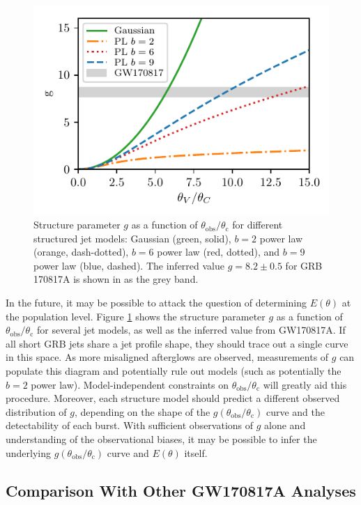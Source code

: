 \documentclass[twocolumn]{aastex62}
\newcommand{\gwbns}{GW170817A}
\newcommand{\grbbns}{GRB 170817A}
\newcommand{\thobs}{\ensuremath{\theta_{\mathrm{obs}}}}
\newcommand{\thC}{\ensuremath{\theta_{\mathrm{c}}}}
\begin{document}
\begin{figure}
	\includegraphics[width=\columnwidth]{figs/g_plot.pdf}
	\caption{Structure parameter $g$ as a function of $\thobs/\thC$ for different structured jet models: Gaussian (green, solid), $b=2$ power law (orange, dash-dotted), $b=6$ power law (red, dotted), and $b=9$ power law (blue, dashed).  The inferred value $g = 8.2\pm0.5$ for \grbbns{} is shown in as the grey band. \label{fig:gPop}}
\end{figure}

In the future, it may be possible to attack the question of determining $E(\theta)$ at the population level.  Figure \ref{fig:gPop} shows the structure parameter $g$ as a function of $\thobs/\thC$ for several jet models, as well as the inferred value from \gwbns{}.  If all short GRB jets share a jet profile shape, they should trace out a single curve in this space.  As more misaligned afterglows are observed, measurements of $g$ can populate this diagram and potentially rule out models (such as potentially the $b=2$ power law).  Model-independent constraints on $\thobs/\thC$ will greatly aid this procedure.  Moreover, each structure model should predict a different observed distribution of $g$, depending on the shape of the $g(\thobs/\thC)$ curve and the detectability of each burst.  With sufficient observations of $g$ alone and understanding of the observational biases, it may be possible to infer the underlying $g(\thobs/\thC)$ curve and $E(\theta)$ itself.

\subsection{Comparison With Other \gwbns{} Analyses}
\end{document}
